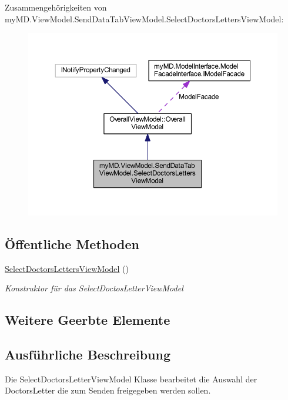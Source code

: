 Zusammengehörigkeiten von my\+M\+D.\+View\+Model.\+Send\+Data\+Tab\+View\+Model.\+Select\+Doctors\+Letters\+View\+Model\+:\nopagebreak
\begin{figure}[H]
\begin{center}
\leavevmode
\includegraphics[width=350pt]{classmy_m_d_1_1_view_model_1_1_send_data_tab_view_model_1_1_select_doctors_letters_view_model__coll__graph}
\end{center}
\end{figure}
\subsection*{Öffentliche Methoden}
\begin{DoxyCompactItemize}
\item 
\mbox{\hyperlink{classmy_m_d_1_1_view_model_1_1_send_data_tab_view_model_1_1_select_doctors_letters_view_model_a87c5e4323853a8ec4a634b011d26ae97}{Select\+Doctors\+Letters\+View\+Model}} ()
\begin{DoxyCompactList}\small\item\em Konstruktor für das Select\+Doctos\+Letter\+View\+Model \end{DoxyCompactList}\end{DoxyCompactItemize}
\subsection*{Weitere Geerbte Elemente}


\subsection{Ausführliche Beschreibung}
Die Select\+Doctors\+Letter\+View\+Model Klasse bearbeitet die Auswahl der Doctors\+Letter die zum Senden freigegeben werden sollen. 




